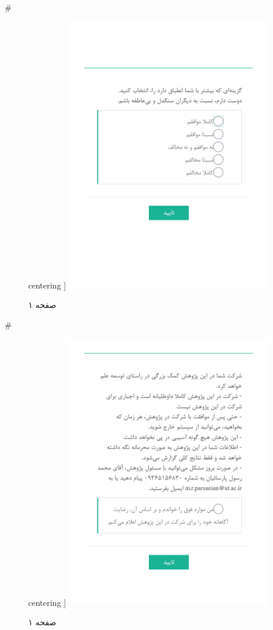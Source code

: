 { 
 # 
\begin{figure}[htpb]
centering ]
\includegraphics[width=0.8\textwidth]{./img/Task29.png/}
\caption{صفحه ۱}
\label{fig:Task1}
\end{figure}
 
 
 # 
\begin{figure}[htpb]
centering ]
\includegraphics[width=0.8\textwidth]{./img/Task2.png/}
\caption{صفحه ۱}
\label{fig:Task1}
\end{figure}
 
}
